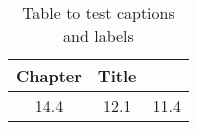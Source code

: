 \begin{table}[h!]
\centering
\begin{tabular}{ccc}
{Chapter} & {Title} &} \\ 
\hline
{14.4} & {12.1} & {11.4} \\
\end{tabular}
\caption{Table to test captions and labels}
\label{table:1}
\end{table}
